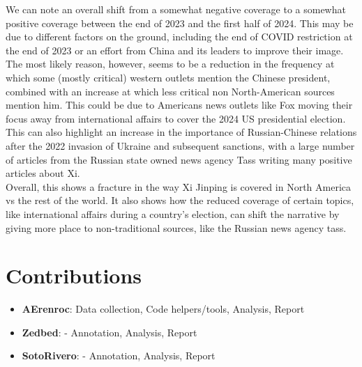 \documentclass{article}
\begin{document}
    
   We can note an overall shift from a somewhat negative coverage to a somewhat positive coverage between the 
   end of 2023 and the first half of 2024. This may be due to different factors on the ground, including the end 
   of COVID restriction at the end of 2023 or an effort from China and its leaders to improve their image. The most 
   likely reason, however, seems to be a reduction in the frequency at which some (mostly critical) western outlets 
   mention the Chinese president, combined with an increase at which less critical non North-American sources mention 
   him. This could be due to Americans news outlets like Fox moving their focus away from international affairs to cover 
   the 2024 US presidential election. This can also highlight an increase in the importance of Russian-Chinese relations 
   after the 2022 invasion of Ukraine and subsequent sanctions, with a large number of articles from the Russian state 
   owned news agency Tass writing many positive articles about Xi. \\

   Overall, this shows a fracture in the way Xi Jinping is covered in North America vs the rest of the world. It also shows 
   how the reduced coverage of certain topics, like international affairs during a country's election, can shift the narrative
    by giving more place to non-traditional sources, like the Russian news agency tass.



   \section{Contributions} %
   \begin{itemize}
      \item \textbf{AErenroc}: Data collection, Code helpers/tools, Analysis, Report
      \item \textbf{Zedbed}: - Annotation, Analysis, Report
      \item \textbf{SotoRivero}: - Annotation, Analysis, Report
   \end{itemize}

   
\end{document}

